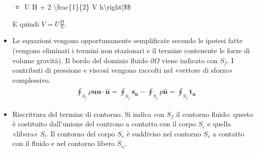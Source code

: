 \documentclass[letterpaper,10pt,italian]{jupyterBook}
\begin{document}
\begin{itemize}
\begin{itemize}
\item {} 
\sphinxAtStartPar
U H + 2 \textbackslash{}frac\{1\}\{2\} V h\textbackslash{}right{]}\$\$

\end{itemize}

\sphinxAtStartPar
E quindi \(V = U \frac{H}{h}\).

\item {} 
\sphinxAtStartPar
Le equazioni vengono opportunamente semplificate secondo le ipotesi
fatte (vengono eliminati i termini non stazionari e il termine
contenente le forze di volume \sphinxhyphen{} gravità). Il bordo del dominio
fluido \(\partial \Omega\) viene indicato con \(S_f\). I contributi di
pressione e viscosi vengono raccolti nel «vettore di sforzo»
complessivo.
\begin{equation*}
\begin{split}\begin{split}
     & \oint_{S_f} \rho \bm{u} \bm{u} \cdot \hat{\bm{n}}= 
     \oint_{S_{f}}  {\bm{s}}_{\bm{n}} - \oint_{S_f} p {\hat{\bm{n}}}
      = \oint_{S_{f}}  {\bm{t}}_{\bm{n}} 
    \end{split}\end{split}
\end{equation*}
\item {} 
\sphinxAtStartPar
Riscrittura del termine di contorno. Si indica con \(S_f\) il contorno
fluido: questo è costituito dall’unione del controno a contatto con
il corpo \(S_c\) e quella «libera» \(S_l\). Il contorno del corpo
\(S_{s}\) è suddiviso nel contorno \(S_c\) a contatto con il fluido e
nel contorno libero \(S_{c_l}\).


\end{itemize}
\end{document}
